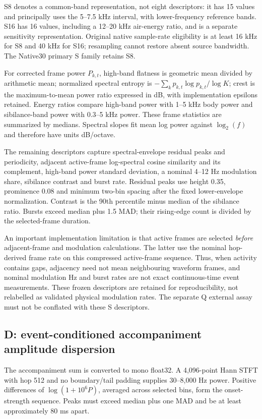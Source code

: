 S8 denotes a common-band representation, not eight descriptors: it has
15 values and principally uses the 5--7.5 kHz interval, with lower-frequency
reference bands. S16 has 16 values, including a 12--20 kHz air-energy ratio,
and is a separate sensitivity representation. Original native sample-rate
eligibility is at least 16 kHz for S8 and 40 kHz for S16; resampling cannot
restore absent source bandwidth. The Native30 primary S family retains S8.

For corrected frame power $P_{k,t}$, high-band flatness is geometric mean
divided by arithmetic mean; normalized spectral entropy is
$-\sum_k p_{k,t}\log p_{k,t}/\log K$; crest is
the maximum-to-mean power ratio expressed in dB, with implementation
epsilons retained. Energy ratios compare high-band power with 1--5 kHz
body power and sibilance-band power with 0.3--5 kHz power. These frame
statistics are summarized by medians. Spectral slopes fit mean log power
against $\log_2(f)$ and therefore have units dB/octave.

The remaining descriptors capture spectral-envelope residual peaks and
periodicity, adjacent active-frame log-spectral cosine similarity and its
complement, high-band power standard deviation, a nominal 4--12 Hz
modulation share, sibilance contrast and burst rate. Residual peaks use
height 0.35, prominence 0.08 and minimum two-bin spacing after the fixed
lower-envelope normalization. Contrast is the 90th percentile minus median
of the sibilance ratio. Bursts exceed median plus 1.5 MAD; their rising-edge
count is divided by the selected-frame duration.

An important implementation limitation is that active frames are selected
\emph{before} adjacent-frame and modulation calculations. The latter use
the nominal hop-derived frame rate on this compressed active-frame sequence.
Thus, when activity contains gaps, adjacency need not mean neighbouring
waveform frames, and nominal modulation Hz and burst rates are not exact
continuous-time event measurements. These frozen descriptors are retained
for reproducibility, not relabelled as validated physical modulation rates.
The separate Q external assay must not be conflated with these S descriptors.

\subsection{D: event-conditioned accompaniment amplitude dispersion}
The accompaniment sum is converted to mono float32. A 4,096-point Hann
STFT with hop 512 and no boundary/tail padding supplies 30--8,000 Hz power.
Positive differences of $\log(1+10^6P)$, averaged across selected bins,
form the onset-strength sequence. Peaks must exceed median plus one MAD
and be at least approximately 80 ms apart.


